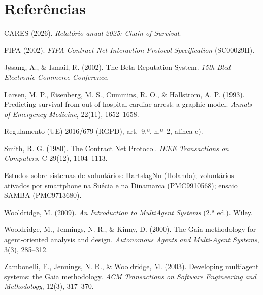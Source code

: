 \documentclass[10pt,a4paper]{article}
\begin{document}
\section*{Referências}

\begin{list}{}{\setlength{\leftmargin}{1.5em}\setlength{\itemindent}{-1.5em}\setlength{\itemsep}{1pt}}
\item CARES (2026). \emph{Relatório anual 2025: Chain of Survival}.
\item FIPA (2002). \emph{FIPA Contract Net Interaction Protocol Specification} (SC00029H).
\item Jøsang, A., \& Ismail, R. (2002). The Beta Reputation System. \emph{15th Bled Electronic Commerce Conference}.
\item Larsen, M. P., Eisenberg, M. S., Cummins, R. O., \& Hallstrom, A. P. (1993). Predicting survival from out-of-hospital cardiac arrest: a graphic model. \emph{Annals of Emergency Medicine}, 22(11), 1652--1658.
\item Regulamento (UE) 2016/679 (RGPD), art.~9.º, n.º~2, alínea c).
\item Smith, R. G. (1980). The Contract Net Protocol. \emph{IEEE Transactions on Computers}, C-29(12), 1104--1113.
\item Estudos sobre sistemas de voluntários: HartslagNu (Holanda); voluntários ativados por smartphone na Suécia e na Dinamarca (PMC9910568); ensaio SAMBA (PMC9713680).
\item Wooldridge, M. (2009). \emph{An Introduction to MultiAgent Systems} (2.ª ed.). Wiley.
\item Wooldridge, M., Jennings, N. R., \& Kinny, D. (2000). The Gaia methodology for agent-oriented analysis and design. \emph{Autonomous Agents and Multi-Agent Systems}, 3(3), 285--312.
\item Zambonelli, F., Jennings, N. R., \& Wooldridge, M. (2003). Developing multiagent systems: the Gaia methodology. \emph{ACM Transactions on Software Engineering and Methodology}, 12(3), 317--370.
\end{list}
\end{document}
